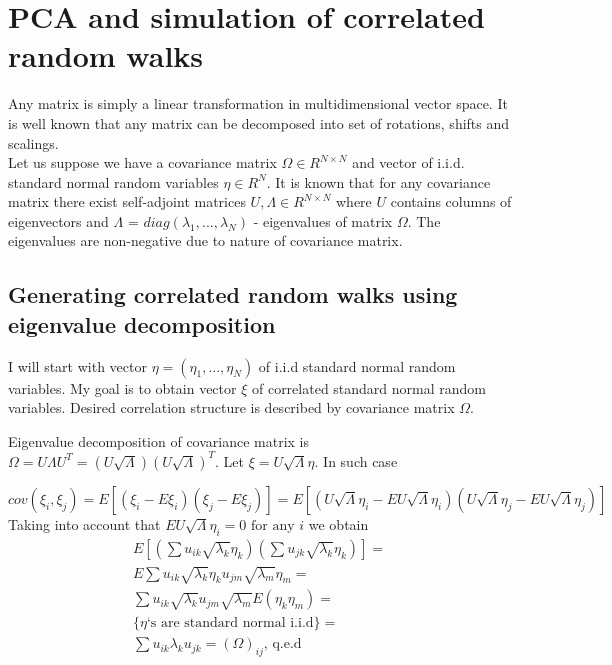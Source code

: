 \documentclass[11pt]{article} %
\newcommand{\euley}{U\sqrt{\Lambda}\eta}
\newcommand{\uley}[1]{\euley_#1}
\begin{document}
\section{PCA and simulation of correlated random walks}
\label{ap:PCA}

Any matrix is simply a linear transformation in multidimensional vector space. It is well known that any matrix can be decomposed into set of rotations, shifts and scalings. %
\\

Let us suppose we have a covariance matrix $\Omega \in R^{N \times N}$ and vector of i.i.d. standard normal random variables $\eta \in R^N$. It is known that for any covariance matrix there exist self-adjoint matrices $U, \Lambda \in R^{N \times N}$ where $U$ contains columns of eigenvectors and $\Lambda \text{ = } diag(\lambda_1, ..., \lambda_N)$ - eigenvalues of matrix $\Omega$. The eigenvalues are non-negative due to nature of covariance matrix.


\subsection{Generating correlated random walks using eigenvalue decomposition}
I will start with vector $\eta = (\eta_1, ..., \eta_N)$ of i.i.d standard normal random variables. My goal is to obtain vector $\xi$ of correlated standard normal random variables. Desired correlation structure is described by covariance matrix $\Omega$.

Eigenvalue decomposition of covariance matrix is $\Omega = U \Lambda U^T = \left(U\sqrt{\Lambda}\right) \left(U\sqrt{\Lambda}\right)^T$. Let $\xi =\euley$. In such case

\begin{equation}
cov(\xi_i,\xi_j) = 
E\left[(\xi_i-E\xi_i)(\xi_j-E\xi_j)\right] =
E\left[\left(\uley{i}-E\uley{i}\right)\left(\uley{j}-E\uley{j}\right)\right]  \nonumber 
\end{equation}
Taking into account that $E\uley{i} = 0 \text{ for any } i$ we obtain
\begin{multline}
E\left[\left(\sum{u_{ik}\sqrt{\lambda_k}\eta_k}\right)\left(\sum{u_{jk}\sqrt{\lambda_k}\eta_k}\right)\right] = \\
E\sum{u_{ik}\sqrt{\lambda_k}\eta_k u_{jm}\sqrt{\lambda_m}\eta_m} = \\
\sum{u_{ik}\sqrt{\lambda_k}u_{jm}\sqrt{\lambda_m}E(\eta_k\eta_m)} = \\
 \{\eta\text{`s are standard normal i.i.d}\} = \\
\sum{u_{ik}\lambda_ku_{jk}} = \left(\Omega\right)_{ij} \text{, q.e.d}
\end{multline}
\end{document}
